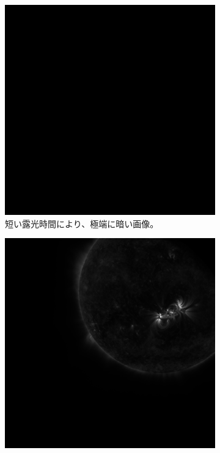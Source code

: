 \begin{figure}[htbp]
    \centering
    \begin{subfigure}[b]{0.48\textwidth}
        \includegraphics[width=\textwidth]{figures/bad_sample0.png}
        \caption{短い露光時間により、極端に暗い画像。}
    \end {subfigure}
    \hfill
    \begin{subfigure}[b]{0.48\textwidth}
        \includegraphics[width=\textwidth]{figures/bad_sample1.jpg}

\end{subfigure}
\end{figure}
